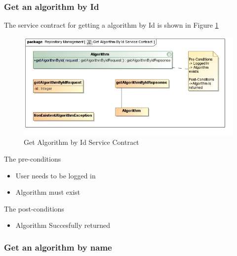 \subsubsection {Get an algorithm by Id}
The service contract for getting a algorithm by Id is shown in Figure \ref{fig:getAlgoByIdService}
\begin{figure}[H]
  \begin{center}
  \includegraphics[scale=0.6]{../Diagrams and Charts/Test Data/Get Algorithm By Id Service Contract.jpg}
  \caption{Get Algorithm by Id Service Contract}
  \label{fig:getAlgoByIdService}
  \end{center}
  
\end{figure}

The pre-conditions
\begin{itemize}
  \item User needs to be logged in
  \item Algorithm must exist
\end{itemize}

The post-conditions
\begin{itemize}
  \item Algorithm Succesfully returned
\end{itemize}

\subsubsection {Get an algorithm by name}

